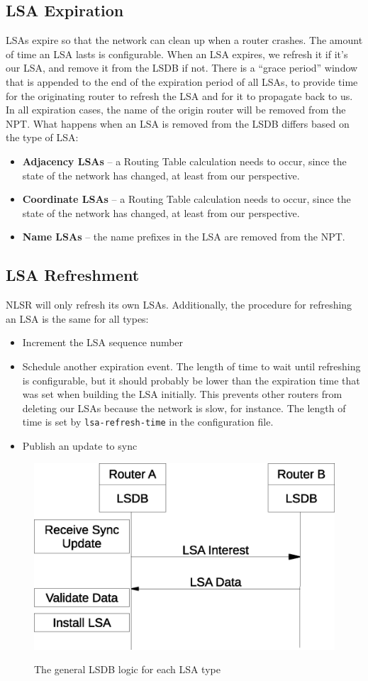 \subsection{LSA Expiration}
LSAs expire so that the network can clean up when a router
crashes. The amount of time an LSA lasts is configurable. When an LSA
expires, we refresh it if it's our LSA, and remove it from the LSDB if
not. There is a ``grace period'' window that is appended to the end of
the expiration period of all LSAs, to provide time for the originating
router to refresh the LSA and for it to propagate back to us. In all
expiration cases, the name of the origin router will be removed from
the NPT. What happens when an LSA is removed from the LSDB differs
based on the type of LSA:
\begin{itemize}
  \item \textbf{Adjacency LSAs} -- a Routing Table calculation needs to occur,
    since the state of the network has changed, at least from our
    perspective.
  \item \textbf{Coordinate LSAs} -- a Routing Table calculation needs to occur,
    since the state of the network has changed, at least from our
    perspective.
  \item \textbf{Name LSAs} -- the name prefixes in the LSA are removed from the
    NPT.
\end{itemize}

\subsection{LSA Refreshment}
NLSR will only refresh its own LSAs. Additionally, the procedure for refreshing an LSA is the same for all types:
\begin{itemize}
\item Increment the LSA sequence number
\item Schedule another expiration event. The length of time to wait
  until refreshing is configurable, but it should probably be lower
  than the expiration time that was set when building the LSA
  initially. This prevents other routers from deleting our LSAs
  because the network is slow, for instance. The length of time is set
  by \texttt{lsa-refresh-time} in the configuration file.
\item Publish an update to sync
\end{itemize}

\begin{figure}[h]
\center
\includegraphics[width=0.5\linewidth]{figures/generic-lsdb-flow}
\label{fig:generic-lsdb-flow}
\caption{The general LSDB logic for each LSA type}
\end{figure}
